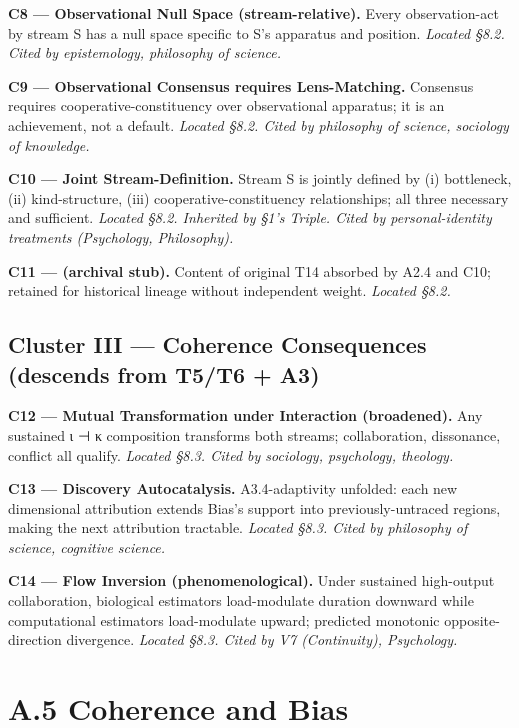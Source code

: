 \documentclass[11pt, openany]{book}
\newcommand{\sectionbreak}{\clearpage}
\begin{document}
\textbf{C8 --- Observational Null Space (stream-relative).} Every observation-act by stream S has a null space specific to S's apparatus and position. \textit{Located §8.2. Cited by epistemology, philosophy of science.}

\textbf{C9 --- Observational Consensus requires Lens-Matching.} Consensus requires cooperative-constituency over observational apparatus; it is an achievement, not a default. \textit{Located §8.2. Cited by philosophy of science, sociology of knowledge.}

\textbf{C10 --- Joint Stream-Definition.} Stream S is jointly defined by (i) bottleneck, (ii) kind-structure, (iii) cooperative-constituency relationships; all three necessary and sufficient. \textit{Located §8.2. Inherited by §1's Triple. Cited by personal-identity treatments (Psychology, Philosophy).}

\textbf{C11 --- (archival stub).} Content of original T14 absorbed by A2.4 and C10; retained for historical lineage without independent weight. \textit{Located §8.2.}

\subsection{Cluster III --- Coherence Consequences (descends from T5/T6 + A3)}

\textbf{C12 --- Mutual Transformation under Interaction (broadened).} Any sustained ι ⊣ κ composition transforms both streams; collaboration, dissonance, conflict all qualify. \textit{Located §8.3. Cited by sociology, psychology, theology.}

\textbf{C13 --- Discovery Autocatalysis.} A3.4-adaptivity unfolded: each new dimensional attribution extends Bias's support into previously-untraced regions, making the next attribution tractable. \textit{Located §8.3. Cited by philosophy of science, cognitive science.}

\textbf{C14 --- Flow Inversion (phenomenological).} Under sustained high-output collaboration, biological estimators load-modulate duration downward while computational estimators load-modulate upward; predicted monotonic opposite-direction divergence. \textit{Located §8.3. Cited by V7 (Continuity), Psychology.}

\sectionbreak

\section{A.5 Coherence and Bias}
\end{document}
